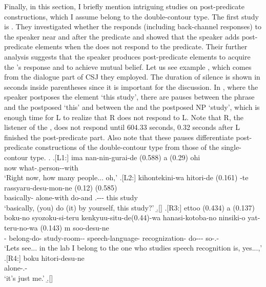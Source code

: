 Finally, in this section,
I briefly mention intriguing studies on post-predicate constructions,
which I assume belong to the double-contour type.
The first study is .
They investigated whether the  responds (including back-channel responses) to the speaker near and after the predicate and showed that
the speaker adds post-predicate elements
when the  does not respond to the predicate.
Their further analysis suggests that the speaker produces post-predicate elements to acquire the 's response and to achieve mutual belief.
Let us see example \Next,
which comes from the dialogue part of CSJ they employed.
The duration of silence is shown in seconds inside parentheses
since it is important for the discussion.
In \Next[-L2], where the speaker postposes the element  `this study',
there are pauses between the  phrase and the postposed   `this' and between the  and the postposed NP  `study',
which is enough time for L to realize that
R does not respond to L.
Note that R, the listener of the ,
does not respond until 604.33 seconds,
0.32 seconds after L finished the post-predicate part.
Also note that
these pauses differentiate post-predicate constructions of the double-contour type from those of the single-contour type.
%
\ex.
 \ag.[L1:] ima nan-nin-gurai-de (0.588) a (0.29) ohi \\
           now what-.person--with {}  {}  \\
           `Right now, how many people... oh,'
 \bg.[L2:] kihontekini-wa hitori-de (0.161) -te rassyaru-desu-mon-ne
           (0.12)  (0.585)  \\
           basically- alone-with {} do-and .--- {} this {} study \\
           `basically, (you) do (it) by yourself, this study?'
 \b.[] 
 \bg.[R3:] ettoo (0.434) a (0.137) boku-no syozoku-si-teru kenkyuu-situ-de(0.44)-wa hanasi-kotoba-no ninsiki-o yat-teru-no-wa (0.143) m soo-desu-ne \\
            {}  {} - belong-do- study-room-- speech-language- recognization- do--- {}  so-.- \\
           `Lets see... in the lab I belong to the one who studies speech recognition is, yes...,'
 \bg.[R4:] boku hitori-desu-ne \\
       alone-.- \\
      `it's just me.'
  \b.[] \hfill{\cite[287]{kakuden12}}



